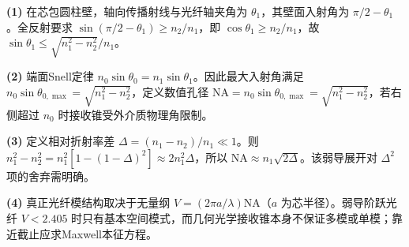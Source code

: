 \par\noindent\textbf{(1)} 在芯包圆柱壁，轴向传播射线与光纤轴夹角为 \(\theta_1\)，其壁面入射角为 \(\pi/2-\theta_1\)。全反射要求 \(\sin(\pi/2-\theta_1)\ge n_2/n_1\)，即 \(\cos\theta_1\ge n_2/n_1\)，故 \(\sin\theta_1\le\sqrt{n_1^2-n_2^2}/n_1\)。
\par\noindent\textbf{(2)} 端面Snell定律 \(n_0\sin\theta_0=n_1\sin\theta_1\)。因此最大入射角满足 \(n_0\sin\theta_{0,\max}=\sqrt{n_1^2-n_2^2}\)，定义数值孔径 \(\mathrm{NA}=n_0\sin\theta_{0,\max}=\sqrt{n_1^2-n_2^2}\)，若右侧超过 \(n_0\) 时接收锥受外介质物理角限制。
\par\noindent\textbf{(3)} 定义相对折射率差 \(\Delta=(n_1-n_2)/n_1\ll1\)。则 \(n_1^2-n_2^2=n_1^2[1-(1-\Delta)^2]\approx2n_1^2\Delta\)，所以 \(\mathrm{NA}\approx n_1\sqrt{2\Delta}\)。该弱导展开对 \(\Delta^2\) 项的舍弃需明确。
\par\noindent\textbf{(4)} 真正光纤模结构取决于无量纲 \(V=(2\pi a/\lambda)\mathrm{NA}\)（\(a\) 为芯半径）。弱导阶跃光纤 \(V<2.405\) 时只有基本空间模式，而几何光学接收锥本身不保证多模或单模；靠近截止应求Maxwell本征方程。

